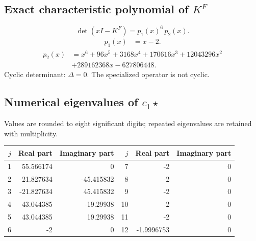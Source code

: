 \documentclass[10pt,a4paper]{article}
\begin{document}
\subsection*{Exact characteristic polynomial of $K^F$}
\[\det(xI-K^F)=p_{1}(x)^{6}\,p_{2}(x).\]
\[\begin{aligned}p_{1}(x)&=x - 2.\end{aligned}\]
\[\begin{aligned}p_{2}(x)&=x^{6} + 96 x^{5} + 3168 x^{4} + 170616 x^{3} + 12043296 x^{2}\\&+289162368 x - 627806448.\end{aligned}\]
Cyclic determinant: $\Delta=0$. The specialized operator is not cyclic.
\subsection*{Numerical eigenvalues of $c_1\star$}
Values are rounded to eight significant digits; repeated eigenvalues are retained with multiplicity.
\begin{center}\small\begin{tabular}{rrr@{\qquad}rrr}\toprule $j$ & Real part & Imaginary part & $j$ & Real part & Imaginary part\\\midrule
1 & 55.566174 & 0 & 7 & -2 & 0\\
2 & -21.827634 & -45.415832 & 8 & -2 & 0\\
3 & -21.827634 & 45.415832 & 9 & -2 & 0\\
4 & 43.044385 & -19.29938 & 10 & -2 & 0\\
5 & 43.044385 & 19.29938 & 11 & -2 & 0\\
6 & -2 & 0 & 12 & -1.9996753 & 0\\
\bottomrule\end{tabular}\end{center}
\end{document}
